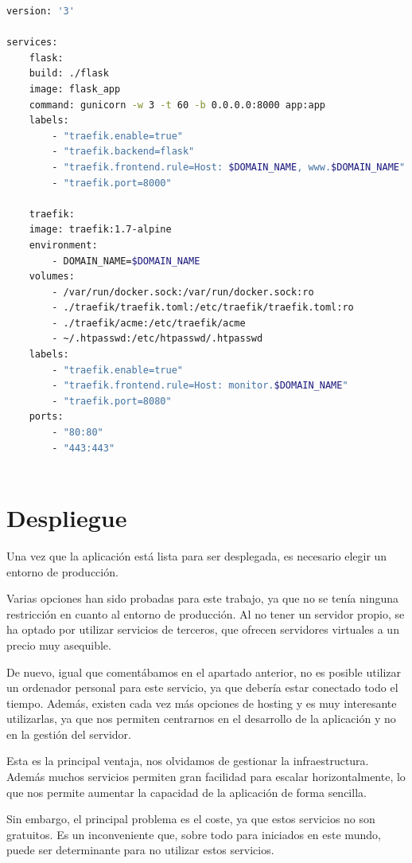 \begin{lstlisting}[language=bash, caption={Fichero Docker Compose.}, label={lst:docker-compose}]
version: '3'

services:
    flask:
    build: ./flask
    image: flask_app
    command: gunicorn -w 3 -t 60 -b 0.0.0.0:8000 app:app
    labels:
        - "traefik.enable=true"
        - "traefik.backend=flask"
        - "traefik.frontend.rule=Host: $DOMAIN_NAME, www.$DOMAIN_NAME"
        - "traefik.port=8000"

    traefik:
    image: traefik:1.7-alpine
    environment:
        - DOMAIN_NAME=$DOMAIN_NAME
    volumes:
        - /var/run/docker.sock:/var/run/docker.sock:ro
        - ./traefik/traefik.toml:/etc/traefik/traefik.toml:ro
        - ./traefik/acme:/etc/traefik/acme
        - ~/.htpasswd:/etc/htpasswd/.htpasswd
    labels:
        - "traefik.enable=true"
        - "traefik.frontend.rule=Host: monitor.$DOMAIN_NAME"
        - "traefik.port=8080"
    ports:
        - "80:80"
        - "443:443"
    

\end{lstlisting}


\section{Despliegue}
Una vez que la aplicación está lista para ser desplegada, es necesario elegir un entorno de producción.

Varias opciones han sido probadas para este trabajo, ya que no se tenía ninguna restricción en cuanto al entorno de producción.
Al no tener un servidor propio, se ha optado por utilizar servicios de terceros, que ofrecen servidores virtuales a un precio muy asequible.

De nuevo, igual que comentábamos en el apartado anterior, no es posible utilizar un ordenador personal para este servicio, ya que debería estar conectado todo el tiempo.
Además, existen cada vez más opciones de hosting y es muy interesante utilizarlas, ya que nos permiten centrarnos en el desarrollo de la aplicación y no en la gestión del servidor.

Esta es la principal ventaja, nos olvidamos de gestionar la infraestructura.
Además muchos servicios permiten gran facilidad para escalar horizontalmente, lo que nos permite aumentar la capacidad de la aplicación de forma sencilla.

Sin embargo, el principal problema es el coste, ya que estos servicios no son gratuitos.
Es un inconveniente que, sobre todo para iniciados en este mundo, puede ser determinante para no utilizar estos servicios.

